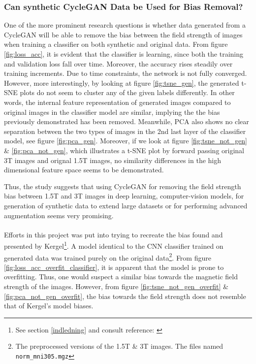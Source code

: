 \documentclass[11pt, fleqn, titlepage]{article}
\newcommand{\1}[1]{\mathds{1}\left[#1\right]}
\begin{document}
\subsubsection{Can synthetic CycleGAN Data be Used for Bias Removal?}
One of the more prominent research questions is whether data generated from a CycleGAN will be able to remove the bias between the field strength of images when training a classifier on both synthetic and original data. From figure \ref{fig:loss_acc}, it is evident that the classifier is learning, since both the training and validation loss fall over time. Moreover, the accuracy rises steadily over training increments. Due to time constraints, the network is not fully converged. However, more interestingly, by looking at figure \ref{fig:tsne_gen}, the generated t-SNE plots do not seem to cluster any of the given labels differently. In other words, the internal feature representation of generated images compared to original images in the classifier model are similar, implying the the bias previously demonstrated has been removed. Meanwhile, PCA also shows no clear separation between the two types of images in the 2nd last layer of the classifier model, see figure \ref{fig:pca_gen}. Moreover, if we look at figure \ref{fig:tsne_not_gen} \& \ref{fig:pca_not_gen}, which illustrates a t-SNE plot by forward passing original 3T images and orignal 1.5T images, no similarity differences in the high dimensional feature space seems to be demonstrated.

Thus, the study suggests that using CycleGAN for removing the field strength bias between 1.5T and 3T images in deep learning, computer-vision models, for generation of synthetic data to extend large datasets or for performing advanced augmentation seems very promising. 
\\\\
\noindent Efforts in this project was put into trying to recreate the bias found and presented by Kergel\footnote{See section \ref{indledning} and consult reference: \cite{CamillaKandidat}}. A model identical to the CNN classifier trained on generated data was trained purely on the original data\footnote{The preprocessed versions of the 1.5T \& 3T images. The files named \texttt{norm\_mni305.mgz}}. From figure \ref{fig:loss_acc_overfit_classifier}, it is apparent that the model is prone to overfitting. Thus, one would suspect a similar bias towards the magnetic field strength of the images. However, from figure \ref{fig:tsne_not_gen_overfit} \& \ref{fig:pca_not_gen_overfit}, %
the bias towards the field strength does not resemble that of Kergel's model biases. 
\end{document}
